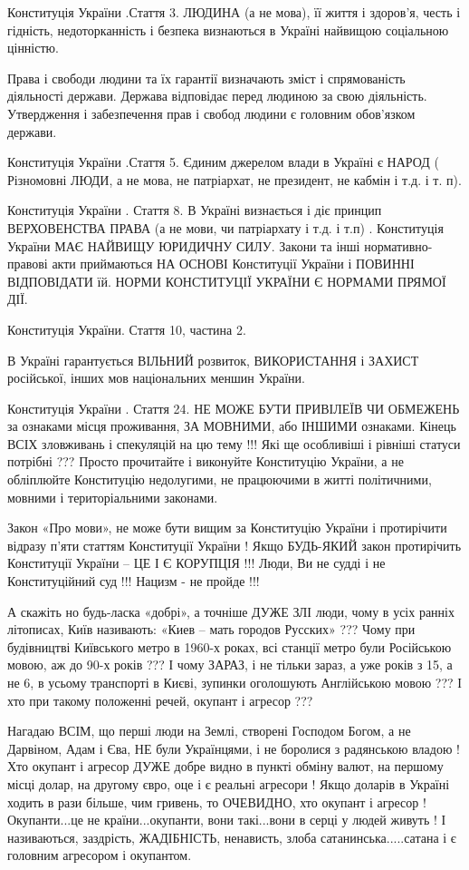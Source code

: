 \begin{itemize}
\begin{itemize}
Конституція України .Стаття 3. ЛЮДИНА (а не мова), її життя і здоров'я, честь і
гідність, недоторканність і безпека визнаються в Україні найвищою соціальною
цінністю.

Права і свободи людини та їх гарантії визначають зміст і спрямованість
діяльності держави. Держава відповідає перед людиною за свою діяльність.
Утвердження і забезпечення прав і свобод людини є головним обов'язком держави.

Конституція України .Стаття 5. Єдиним джерелом влади в Україні є НАРОД (
Різномовні ЛЮДИ, а не мова, не патріархат, не президент, не кабмін і т.д. і т.
п).

Конституція України . Стаття 8. В Україні визнається і діє принцип ВЕРХОВЕНСТВА
ПРАВА (а не мови, чи патріархату і т.д. і т.п) . Конституція України МАЄ
НАЙВИЩУ ЮРИДИЧНУ СИЛУ. Закони та інші нормативно-правові акти приймаються НА
ОСНОВІ Конституції України і ПОВИННІ ВІДПОВІДАТИ їй. НОРМИ КОНСТИТУЦІЇ УКРАЇНИ
Є НОРМАМИ ПРЯМОЇ ДІЇ.

Конституція України. Стаття 10, частина 2.

В Україні гарантується ВІЛЬНИЙ розвиток, ВИКОРИСТАННЯ і ЗАХИСТ російської,
інших мов національних меншин України.

Конституція України . Стаття 24. НЕ МОЖЕ БУТИ ПРИВІЛЕЇВ ЧИ ОБМЕЖЕНЬ за ознаками
місця проживання, ЗА МОВНИМИ, або ІНШИМИ ознаками. Кінець ВСІХ зловживань і
спекуляцій на цю тему !!! Які ще особливіші і рівніші статуси потрібні ???
Просто прочитайте і виконуйте Конституцію України, а не обліплюйте Конституцію
недолугими, не працюючими в житті політичними, мовними і територіальними
законами.

Закон «Про мови», не може бути вищим за Конституцію України і протирічити
відразу п'яти статтям Конституції України ! Якщо БУДЬ-ЯКИЙ закон протирічить
Конституції України – ЦЕ І Є КОРУПЦІЯ !!! Люди, Ви не судді і не Конституційний
суд !!! Нацизм - не пройде !!!

А скажіть но будь-ласка «добрі», а точніше ДУЖЕ ЗЛІ люди, чому в усіх ранніх
літописах, Київ називають: «Киев – мать городов Русских» ??? Чому при
будівництві Київського метро в 1960-х роках, всі станції метро були Російською
мовою, аж до 90-х років ??? І чому ЗАРАЗ, і не тільки зараз, а уже років з 15,
а не 6, в усьому транспорті в Києві, зупинки оголошують Англійською мовою ??? І
хто при такому положенні речей, окупант і агресор ??? 


Нагадаю ВСІМ, що перші люди на Землі, створені Господом Богом, а не Дарвіном,
Адам і Єва, НЕ були Українцями, і не боролися з радянською владою ! Хто окупант
і агресор ДУЖЕ добре видно в пункті обміну валют, на першому місці долар, на
другому євро, оце і є реальні агресори ! Якщо доларів в Україні ходить в рази
більше, чим гривень, то ОЧЕВИДНО, хто окупант і агресор ! Окупанти...це не
країни...окупанти, вони такі...вони в серці у людей живуть ! І називаються,
заздрість, ЖАДІБНІСТЬ, ненависть, злоба сатанинська.....сатана і є головним
агресором і окупантом. 


\end{itemize}
\end{itemize}
